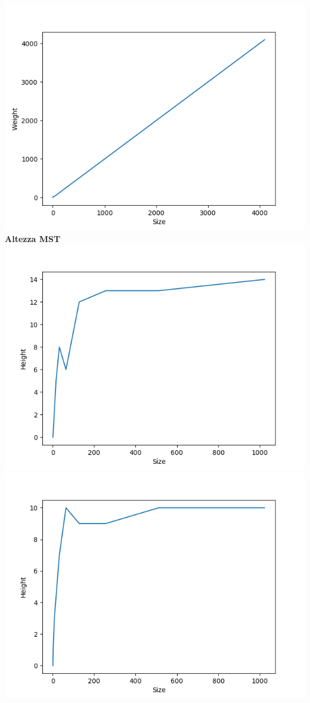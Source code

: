 \documentclass[]{article}
\begin{document}
\includegraphics[scale=0.5]{krusk_Weight_p=1.png}\\
\textbf{Altezza MST}\\
\includegraphics[scale=0.5]{krusk_height_p=02.png}
\includegraphics[scale=0.5]{krusk_height_p=04.png}\\
\end{document}
